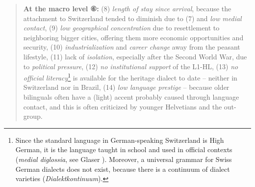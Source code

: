 \documentclass[output=paper,
modfonts
]{langscibook}
\begin{document}
\begin{quote}
\textbf{At the macro level ⑥:} (8) \emph{length of stay since arrival}, because the attachment to Switzerland tended to diminish due to (7) and \emph{low medial contact}, (9) \emph{low geographical concentration} due to resettlement to neighboring bigger cities, offering them more economic opportunities and security, (10) \emph{industrialization} and \emph{career change} away from the peasant lifestyle, (11) lack of \emph{isolation}, especially after the Second World War, due to \emph{political pressure}, (12) \emph{no institutional support} of the L1-HL, (13) \emph{no official literacy}\footnote{Since the standard language in German-speaking Switzerland is High German, it is the language taught in school and used in official contexts (\emph{medial diglossia}, see Glaser \citeyear{Glaser2014}). Moreover, a universal grammar for Swiss German dialects does not exist, because there is a continuum of dialect varieties (\emph{Dialektkontinuum}).} is available for the heritage dialect to date -- neither in Switzerland nor in Brazil, (14) \emph{low language prestige} -- because older bilinguals often have a (light) accent probably caused through language contact, and this is often criticized by younger Helvetians and the out-group.\end{quote}
\end{document}
